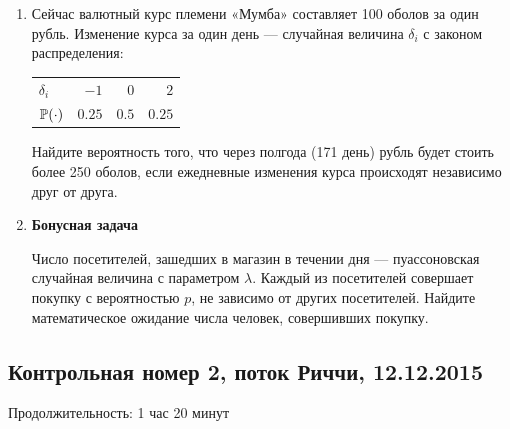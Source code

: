 \documentclass[12pt, a4paper]{article}\usepackage[]{graphicx}\usepackage[]{color}
\begin{document}
\begin{enumerate}
\item Сейчас валютный курс племени «Мумба» составляет 100 оболов за один рубль. Изменение курса за один день — случайная величина $\delta_i$ с законом распределения:

\begin{center}
\begin{tabular}{lrrr}
\toprule
$\delta_i$ & $-1$ & $0$ & $2$ \\
$\P(\cdot)$ & $0.25$ & $0.5$ & $0.25$ \\
\bottomrule
\end{tabular}
\end{center}

Найдите вероятность того, что через полгода (171 день) рубль будет стоить более 250 оболов, если ежедневные изменения курса происходят независимо друг от друга.

\item \textbf{Бонусная задача}

Число посетителей, зашедших в магазин в течении дня — пуассоновская случайная величина с параметром $\lambda$. Каждый из посетителей совершает покупку с вероятностью $p$, не зависимо от других посетителей. Найдите математическое ожидание числа человек, совершивших покупку.

\end{enumerate}

\subsection{Контрольная номер 2, поток Риччи, 12.12.2015}

Продолжительность: 1 час 20 минут
\end{document}
